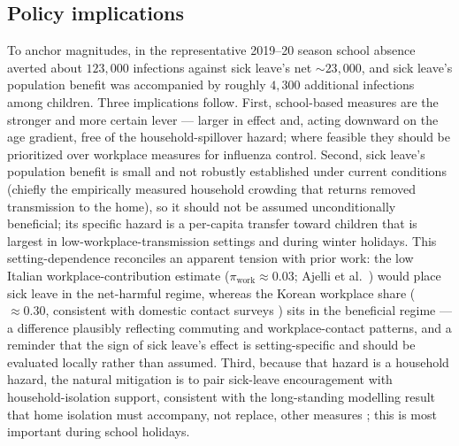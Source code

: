 \documentclass[12pt]{article}
\theoremstyle{plain}
\theoremstyle{remark}
\theoremstyle{definition}
\begin{document}
\subsection{Policy implications}
To anchor magnitudes, in the representative 2019--20 season school absence averted about $123{,}000$ infections against sick leave's net $\sim$$23{,}000$, and sick leave's population benefit was accompanied by roughly $4{,}300$ additional infections among children. Three implications follow. First, school-based measures are the stronger and more certain lever --- larger in effect and, acting downward on the age gradient, free of the household-spillover hazard; where feasible they should be prioritized over workplace measures for influenza control. Second, sick leave's population benefit is small and not robustly established under current conditions (chiefly the empirically measured household crowding that returns removed transmission to the home), so it should not be assumed unconditionally beneficial; its specific hazard is a per-capita transfer toward children that is largest in low-workplace-transmission settings and during winter holidays. This setting-dependence reconciles an apparent tension with prior work: the low Italian workplace-contribution estimate ($\pi_{\mathrm{work}}\approx0.03$; Ajelli et al.\ \cite{Ajelli2014}) would place sick leave in the net-harmful regime, whereas the Korean workplace share ($\approx0.30$, consistent with domestic contact surveys \cite{Son2025}) sits in the beneficial regime --- a difference plausibly reflecting commuting and workplace-contact patterns, and a reminder that the sign of sick leave's effect is setting-specific and should be evaluated locally rather than assumed. Third, because that hazard is a household hazard, the natural mitigation is to pair sick-leave encouragement with household-isolation support, consistent with the long-standing modelling result that home isolation must accompany, not replace, other measures \cite{Halloran2008,Davey2008}; this is most important during school holidays.
\end{document}
